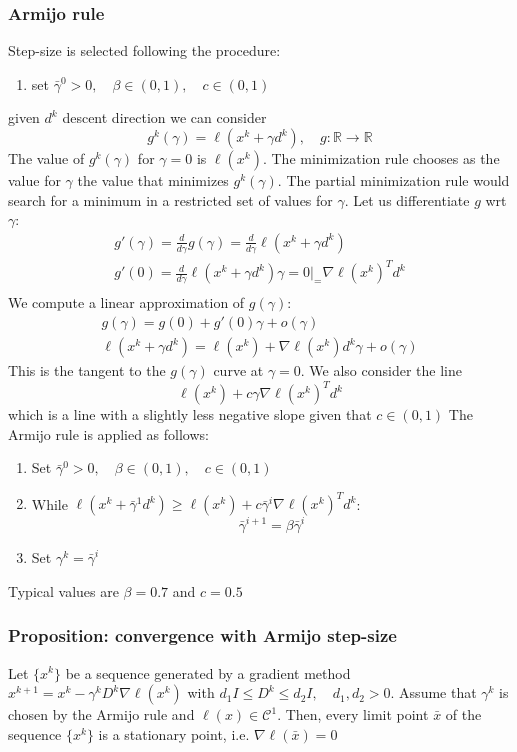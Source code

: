 \documentclass{book}
\newcommand\at[2]{\left.#1\right|_{#2}}
\newcommand{\R}{\mathbb{R}}
\begin{document}
\subsubsection{Armijo rule}
Step-size is selected following the procedure: 
\begin{enumerate}
    \item set $\bar{\gamma}^0>0,\quad \beta\in(0,1),\quad c\in(0,1)$
\end{enumerate}
given $d^k$ descent direction we can consider 
\[
    g^k(\gamma) = \ell(x^k+\gamma d^k), \quad g:\R\to\R
\]
The value of $g^k(\gamma)$ for $\gamma=0$ is $\ell(x^k)$. The minimization rule chooses as the value for $\gamma$ the value that minimizes $g^k(\gamma)$. The partial minimization rule would search for a minimum in a restricted set of values for $\gamma$. Let us differentiate $g$ wrt $\gamma$:
\begin{gather*}
    g'(\gamma)=\displaystyle\frac{d}{d\gamma}g(\gamma)=\displaystyle\frac{d}{d\gamma}\ell(x^k+\gamma d^k)\\
    g'(0) = \displaystyle\frac{d}{d\gamma}\ell(x^k+\gamma d^k)\at{\gamma=0} = \nabla \ell(x^k)^Td^k\\
\end{gather*}
We compute a linear approximation of $g(\gamma)$:
\begin{gather*}
    g(\gamma) = g(0) + g'(0)\gamma+o(\gamma)\\
    \ell(x^k+\gamma d^k) = \ell(x^k)+\nabla\ell(x^k)d^k \gamma + o(\gamma)
\end{gather*}
This is the tangent to the $g(\gamma)$ curve at $\gamma=0$. We also consider the line 
\[
    \ell(x^k)+c\gamma\nabla\ell(x^k)^Td^k
\]
which is a line with a slightly less negative slope given that $c\in(0,1)$
The Armijo rule is applied as follows: 
\begin{enumerate}
    \item Set $\bar{\gamma}^0>0,\quad\beta\in(0,1),\quad c\in(0,1)$
    \item While $\ell(x^k+\bar{\gamma}^1d^k)\geq \ell(x^k)+c\bar{\gamma}^i\nabla\ell(x^k)^Td^k$:
        \[
            \bar{\gamma}^{i+1}=\beta\bar{\gamma}^i
        \]
    \item Set $\gamma^k = \bar{\gamma}^i$
\end{enumerate}
Typical values are $\beta=0.7$ and $c=0.5$

\subsubsection{Proposition: convergence with Armijo step-size}
Let $\{x^k\}$ be a sequence generated by a gradient method $x^{k+1}=x^k-\gamma^kD^k\nabla\ell(x^k)$ with $d_1I\leq D^k \leq d_2I, \quad d_1,d_2>0$. Assume that $\gamma^k$ is chosen by the Armijo rule and $\ell(x)\in \mathcal{C}^1$. Then, every limit point $\bar{x}$ of the sequence $\{x^k\}$ is a stationary point, i.e. $\nabla\ell(\bar{x})=0$
\end{document}
